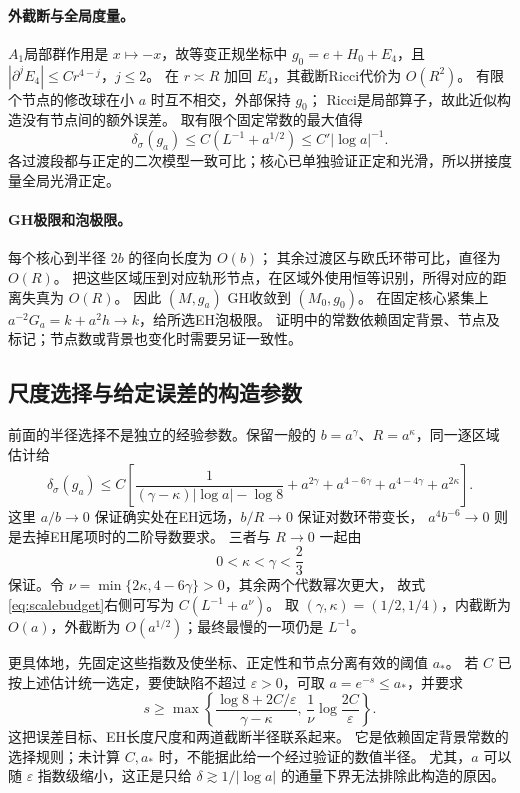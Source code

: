 \documentclass[UTF8,a4paper,11pt,fontset=fandol]{ctexart}
\numberwithin{equation}{section}
\theoremstyle{definition}
\begin{document}
\paragraph{外截断与全局度量。}
$A_1$局部群作用是 $x\mapsto-x$，故等变正规坐标中
$g_0=e+H_0+E_4$，且
$|\partial^jE_4|\le Cr^{4-j}$，$j\le2$。
在 $r\asymp R$ 加回 $E_4$，其截断Ricci代价为 $O(R^2)$。
有限个节点的修改球在小 $a$ 时互不相交，外部保持 $g_0$；
Ricci是局部算子，故此近似构造没有节点间的额外误差。
取有限个固定常数的最大值得
\[
\delta_\sigma(g_a)\le C(L^{-1}+a^{1/2})
\le C'|\log a|^{-1}.
\]
各过渡段都与正定的二次模型一致可比；核心已单独验证正定和光滑，所以拼接度量全局光滑正定。

\paragraph{GH极限和泡极限。}
每个核心到半径 $2b$ 的径向长度为 $O(b)$；
其余过渡区与欧氏环带可比，直径为 $O(R)$。
把这些区域压到对应轨形节点，在区域外使用恒等识别，所得对应的距离失真为 $O(R)$。
因此 $(M,g_a)$ GH收敛到 $(M_0,g_0)$。
在固定核心紧集上 $a^{-2}G_a=k+a^2h\to k$，给所选EH泡极限。
证明中的常数依赖固定背景、节点及标记；节点数或背景也变化时需要另证一致性。

\subsection{尺度选择与给定误差的构造参数}\label{sec:scalechoice}
前面的半径选择不是独立的经验参数。保留一般的
$b=a^\gamma$、$R=a^\kappa$，同一逐区域估计给
\begin{equation}\label{eq:scalebudget}
\delta_\sigma(g_a)\le C\left[
\frac1{(\gamma-\kappa)|\log a|-\log8}
+a^{2\gamma}+a^{4-6\gamma}+a^{4-4\gamma}+a^{2\kappa}\right].
\end{equation}
这里 $a/b\to0$ 保证确实处在EH远场，$b/R\to0$ 保证对数环带变长，
$a^4b^{-6}\to0$ 则是去掉EH尾项时的二阶导数要求。
三者与 $R\to0$ 一起由
\[
0<\kappa<\gamma<\frac23
\]
保证。令 $\nu=\min\{2\kappa,4-6\gamma\}>0$，其余两个代数幂次更大，
故式\eqref{eq:scalebudget}右侧可写为 $C(L^{-1}+a^\nu)$。
取 $(\gamma,\kappa)=(1/2,1/4)$，内截断为 $O(a)$，外截断为
$O(a^{1/2})$；最终最慢的一项仍是 $L^{-1}$。

更具体地，先固定这些指数及使坐标、正定性和节点分离有效的阈值 $a_*$。
若 $C$ 已按上述估计统一选定，要使缺陷不超过 $\varepsilon>0$，可取
$a=e^{-s}\le a_*$，并要求
\begin{equation}\label{eq:targetscale}
s\ge\max\left\{
\frac{\log8+2C/\varepsilon}{\gamma-\kappa},\,
\frac1\nu\log\frac{2C}{\varepsilon}\right\}.
\end{equation}
这把误差目标、EH长度尺度和两道截断半径联系起来。
它是依赖固定背景常数的选择规则；未计算 $C,a_*$ 时，不能据此给一个经过验证的数值半径。
尤其，$a$ 可以随 $\varepsilon$ 指数级缩小，这正是只给
$\delta\gtrsim1/|\log a|$ 的通量下界无法排除此构造的原因。
\end{document}
